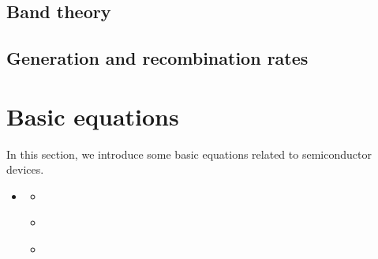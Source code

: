 \documentclass[letterpaper,10pt,english]{sphinxmanual}
\numberwithin{equation}{section}
\begin{document}
\subsection{Band theory}
\label{\detokenize{band_theory:band-theory}}\label{\detokenize{band_theory::doc}}
\sphinxstepscope


\subsection{Generation and recombination rates}
\label{\detokenize{Generation_and_recombination:generation-and-recombination-rates}}\label{\detokenize{Generation_and_recombination:generation-and-recombination}}\label{\detokenize{Generation_and_recombination::doc}}
\sphinxstepscope


\section{Basic equations}
\label{\detokenize{Basic_equation:basic-equations}}\label{\detokenize{Basic_equation:basic-equation}}\label{\detokenize{Basic_equation::doc}}
\sphinxAtStartPar
In this section, we introduce some basic equations related to semiconductor devices.

\begin{sphinxcontents}
\begin{itemize}
\item {} 
\sphinxAtStartPar
{}\label{\detokenize{Basic_equation:id4}}{\hyperref[\detokenize{Basic_equation:basic-equations}]{}}
\begin{itemize}
\item {} 
\sphinxAtStartPar
{}\label{\detokenize{Basic_equation:id5}}{\hyperref[\detokenize{Basic_equation:poisson-equation}]{}}

\item {} 
\sphinxAtStartPar
{}\label{\detokenize{Basic_equation:id6}}{\hyperref[\detokenize{Basic_equation:current-density-equations}]{}}

\item {} 
\sphinxAtStartPar
{}\label{\detokenize{Basic_equation:id7}}{\hyperref[\detokenize{Basic_equation:continuity-equations}]{}}

\end{itemize}

\end{itemize}
\end{sphinxcontents}
\end{document}
